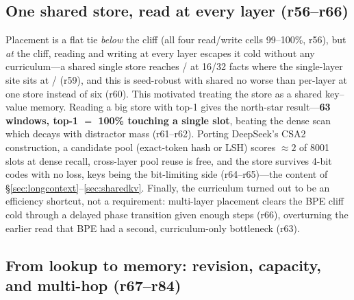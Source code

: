 \subsection{One shared store, read at every layer (r56--r66)}

Placement is a flat tie \emph{below} the cliff (all four read/write cells 99--100\%,
r56), but \emph{at} the cliff, reading and writing at every layer escapes it cold
without any curriculum---a shared single store reaches / at
16/32 facts where the single-layer site sits at / (r59), and
this is seed-robust with shared no worse than per-layer at one store instead of six
(r60). This motivated treating the store as a shared key--value memory. Reading a big
store with top-1 gives the north-star result---\textbf{63 windows, top-1 $=$ 100\%
touching a single slot}, beating the dense scan which decays with distractor mass
(r61--r62). Porting DeepSeek's CSA2 construction, a candidate pool (exact-token hash or
LSH) scores $\approx 2$ of 8001 slots at dense recall, cross-layer pool reuse is free,
and the store survives 4-bit codes with no loss, keys being the bit-limiting side
(r64--r65)---the content of \S\ref{sec:longcontext}--\ref{sec:sharedkv}. Finally, the
curriculum turned out to be an efficiency shortcut, not a requirement: multi-layer
placement clears the BPE cliff cold through a delayed phase transition given enough
steps (r66), overturning the earlier read that BPE had a second, curriculum-only
bottleneck (r63).

\subsection{From lookup to memory: revision, capacity, and multi-hop (r67--r84)}

